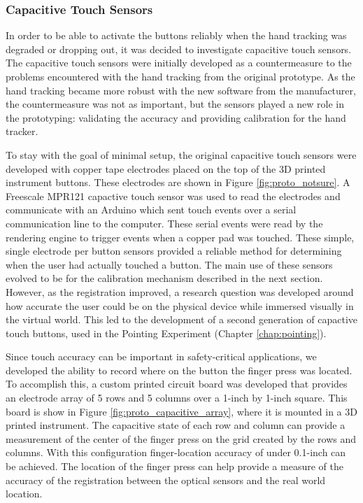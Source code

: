 \subsubsection{Capacitive Touch Sensors}

In order to be able to activate the buttons reliably when the hand tracking was degraded or dropping out, it was decided to investigate capacitive touch sensors.
The capacitive touch sensors were initially developed as a countermeasure to the problems encountered with the hand tracking from the original prototype.
As the hand tracking became more robust with the new software from the manufacturer, the countermeasure was not as important, but the sensors played a new role in the prototyping: validating the accuracy and providing calibration for the hand tracker.

To stay with the goal of minimal setup, the original capacitive touch sensors were developed with copper tape electrodes placed on the top of the 3D printed instrument buttons.
These electrodes are shown in Figure \ref{fig:proto_notsure}.
A Freescale MPR121 capactive touch sensor was used to read the electrodes and communicate with an Arduino which sent touch events over a serial communication line to the computer.
These serial events were read by the rendering engine to trigger events when a copper pad was touched.
These simple, single electrode per button sensors provided a reliable method for determining when the user had actually touched a button.
The main use of these sensors evolved to be for the calibration mechanism described in the next section.
However, as the registration improved, a research question was developed around how accurate the user could be on the physical device while immersed visually in the virtual world.
This led to the development of a second generation of capactive touch buttons, used in the Pointing Experiment (Chapter \ref{chap:pointing}).

Since touch accuracy can be important in safety-critical applications, we developed the ability to record where on the button the finger press was located.
To accomplish this, a custom printed circuit board was developed that provides an electrode array of 5 rows and 5 columns over a 1-inch by 1-inch square.
This board is show in Figure \ref{fig:proto_capacitive_array}, where it is mounted in a 3D printed instrument.
The capacitive state of each row and column can provide a measurement of the center of the finger press on the grid created by the rows and columns.
With this configuration finger-location accuracy of under 0.1-inch can be achieved.
The location of the finger press can help provide a measure of the accuracy of the registration between the optical sensors and the real world location.

